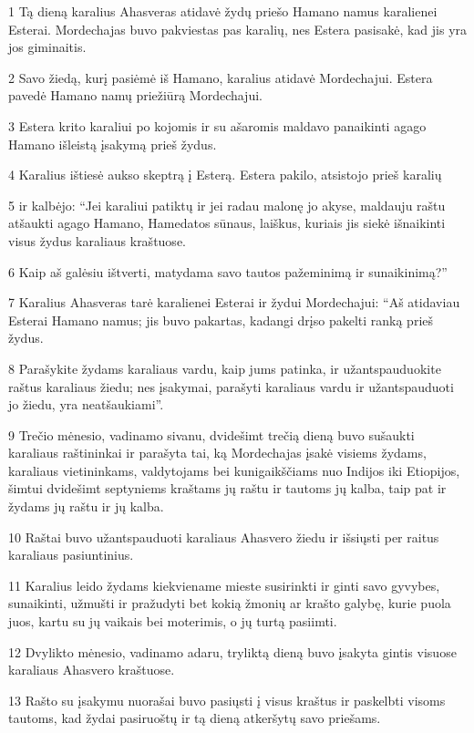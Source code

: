 \par 1 Tą dieną karalius Ahasveras atidavė žydų priešo Hamano namus karalienei Esterai. Mordechajas buvo pakviestas pas karalių, nes Estera pasisakė, kad jis yra jos giminaitis. 
\par 2 Savo žiedą, kurį pasiėmė iš Hamano, karalius atidavė Mordechajui. Estera pavedė Hamano namų priežiūrą Mordechajui. 
\par 3 Estera krito karaliui po kojomis ir su ašaromis maldavo panaikinti agago Hamano išleistą įsakymą prieš žydus. 
\par 4 Karalius ištiesė aukso skeptrą į Esterą. Estera pakilo, atsistojo prieš karalių 
\par 5 ir kalbėjo: “Jei karaliui patiktų ir jei radau malonę jo akyse, maldauju raštu atšaukti agago Hamano, Hamedatos sūnaus, laiškus, kuriais jis siekė išnaikinti visus žydus karaliaus kraštuose. 
\par 6 Kaip aš galėsiu ištverti, matydama savo tautos pažeminimą ir sunaikinimą?” 
\par 7 Karalius Ahasveras tarė karalienei Esterai ir žydui Mordechajui: “Aš atidaviau Esterai Hamano namus; jis buvo pakartas, kadangi drįso pakelti ranką prieš žydus. 
\par 8 Parašykite žydams karaliaus vardu, kaip jums patinka, ir užantspauduokite raštus karaliaus žiedu; nes įsakymai, parašyti karaliaus vardu ir užantspauduoti jo žiedu, yra neatšaukiami”. 
\par 9 Trečio mėnesio, vadinamo sivanu, dvidešimt trečią dieną buvo sušaukti karaliaus raštininkai ir parašyta tai, ką Mordechajas įsakė visiems žydams, karaliaus vietininkams, valdytojams bei kunigaikščiams nuo Indijos iki Etiopijos, šimtui dvidešimt septyniems kraštams jų raštu ir tautoms jų kalba, taip pat ir žydams jų raštu ir jų kalba. 
\par 10 Raštai buvo užantspauduoti karaliaus Ahasvero žiedu ir išsiųsti per raitus karaliaus pasiuntinius. 
\par 11 Karalius leido žydams kiekviename mieste susirinkti ir ginti savo gyvybes, sunaikinti, užmušti ir pražudyti bet kokią žmonių ar krašto galybę, kurie puola juos, kartu su jų vaikais bei moterimis, o jų turtą pasiimti. 
\par 12 Dvylikto mėnesio, vadinamo adaru, tryliktą dieną buvo įsakyta gintis visuose karaliaus Ahasvero kraštuose. 
\par 13 Rašto su įsakymu nuorašai buvo pasiųsti į visus kraštus ir paskelbti visoms tautoms, kad žydai pasiruoštų ir tą dieną atkeršytų savo priešams. 

